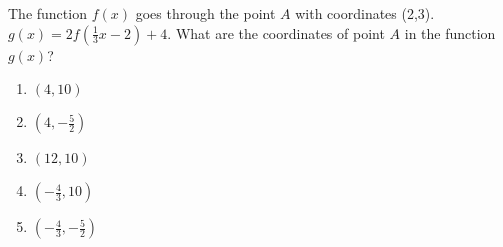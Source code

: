 \bigskip

\item The function $f(x)$ goes through the point $A$ with coordinates (2,3).  $g(x) = 2 f( \frac{1}{3} x - 2) + 4$.  What are the coordinates of point $A$ in the function $g(x)$?

\begin{enumerate}
\item $(4,10)$
\item $(4,-\frac{5}{2})$
\item $(12,10)$
\item $(-\frac{4}{3},10)$
\item $(-\frac{4}{3},-\frac{5}{2})$
\end{enumerate}

